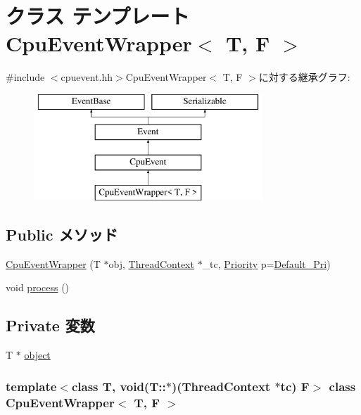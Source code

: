 \hypertarget{classCpuEventWrapper}{
\section{クラス テンプレート CpuEventWrapper$<$ T, F $>$}
\label{classCpuEventWrapper}
}


{\ttfamily \#include $<$cpuevent.hh$>$}CpuEventWrapper$<$ T, F $>$に対する継承グラフ:\begin{figure}[H]
\begin{center}
\leavevmode
\includegraphics[height=4cm]{classCpuEventWrapper}
\end{center}
\end{figure}
\subsection*{Public メソッド}
\begin{DoxyCompactItemize}
\item 
\hyperlink{classCpuEventWrapper_a55c80848dbb951563535d623e2201472}{CpuEventWrapper} (T $\ast$obj, \hyperlink{classThreadContext}{ThreadContext} $\ast$\_\-tc, \hyperlink{classEventBase_a6d92f7ee8144a5911ed46d85a89a4934}{Priority} p=\hyperlink{classEventBase_a6bd0fef0ad63ee49ad5ece92a9dd5f8f}{Default\_\-Pri})
\item 
void \hyperlink{classCpuEventWrapper_a2e9c5136d19b1a95fc427e0852deab5c}{process} ()
\end{DoxyCompactItemize}
\subsection*{Private 変数}
\begin{DoxyCompactItemize}
\item 
T $\ast$ \hyperlink{classCpuEventWrapper_acd5a12b9b1a75e37fd605accfe038a03}{object}
\end{DoxyCompactItemize}
\subsubsection*{template$<$class T, void(T::$\ast$)(ThreadContext $\ast$tc) F$>$ class CpuEventWrapper$<$ T, F $>$}



